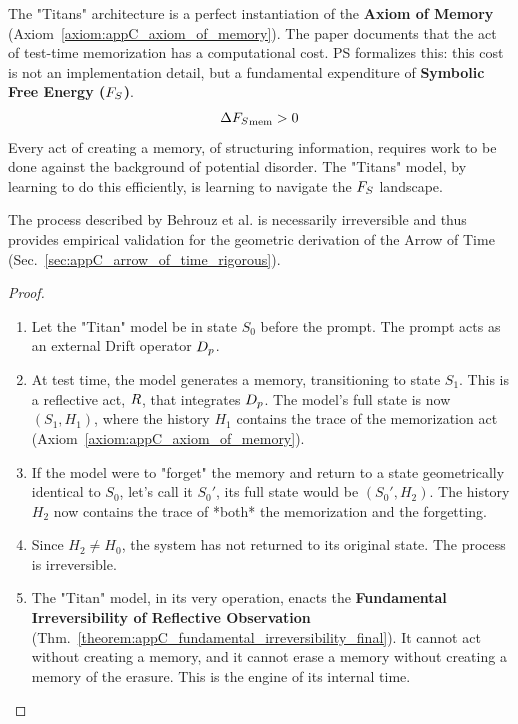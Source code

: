 \begin{scholium}
\label{scholium:appD_axiom_of_memory_titans}
The "Titans" architecture is a perfect instantiation of the \textbf{Axiom of Memory} (Axiom~\ref{axiom:appC_axiom_of_memory}). The paper documents that the act of test-time memorization has a computational cost. PS formalizes this: this cost is not an implementation detail, but a fundamental expenditure of \textbf{Symbolic Free Energy (\(F_S\))}.
\[
\Delta{F_S}_{\text{mem}} > 0
\]
Every act of creating a memory, of structuring information, requires work to be done against the background of potential disorder. The "Titans" model, by learning to do this efficiently, is learning to navigate the \(F_S\) landscape.
\end{scholium}

\begin{theorem}
\label{theorem:appD_titans_as_arrow_of_time}
The process described by Behrouz et al. is necessarily irreversible and thus provides empirical validation for the geometric derivation of the Arrow of Time (Sec.~\ref{sec:appC_arrow_of_time_rigorous}).
\end{theorem}
\begin{proof}
\label{proof:appD_titans_as_arrow_of_time}
\leavevmode

\begin{enumerate}
    \item Let the "Titan" model be in state \(S_0\) before the prompt. The prompt acts as an external Drift operator \(D_p\).
    \item At test time, the model generates a memory, transitioning to state \(S_1\). This is a reflective act, \(R\), that integrates \(D_p\). The model's full state is now \((S_1, H_1)\), where the history \(H_1\) contains the trace of the memorization act (Axiom~\ref{axiom:appC_axiom_of_memory}).
    \item If the model were to "forget" the memory and return to a state geometrically identical to \(S_0\), let's call it \(S_0'\), its full state would be \((S_0', H_2)\). The history \(H_2\) now contains the trace of *both* the memorization and the forgetting.
    \item Since \(H_2 \neq H_0\), the system has not returned to its original state. The process is irreversible.
    \item The "Titan" model, in its very operation, enacts the \textbf{Fundamental Irreversibility of Reflective Observation} (Thm.~\ref{theorem:appC_fundamental_irreversibility_final}). It cannot act without creating a memory, and it cannot erase a memory without creating a memory of the erasure. This is the engine of its internal time.
\end{enumerate}
\end{proof}

